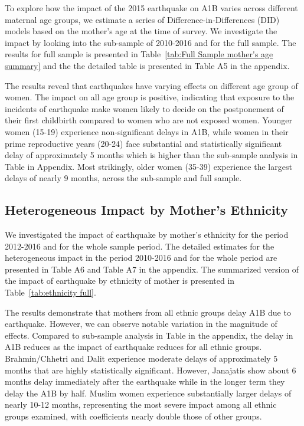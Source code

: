 \documentclass[11pt,a4paper]{article}
\begin{document}
To explore how the impact of the 2015 earthquake on A1B varies across different maternal age groups, we estimate a series of Difference-in-Differences (DID) models based on the mother's age at the time of survey. We investigate the impact by looking into the sub-sample of 2010-2016 and for the full sample. The results for full sample is presented in Table~\ref{tab:Full Sample mother's age summary} and the the detailed table is presented in Table A5 in the appendix.

\vspace{0.25cm}



The results reveal that earthquakes have varying effects on different age group of women. The impact on all age group is positive, indicating that exposure to the incidents of earthquake make women likely to decide on the postponement of their first childbirth compared to women who are not exposed women. Younger women (15-19) experience non-significant delays in A1B, while women in their prime reproductive years (20-24) face substantial and statistically significant delay of approximately 5 months which is higher than the sub-sample analysis in Table in Appendix. Most strikingly, older women (35-39) experience the largest delays of nearly 9 months, across the sub-sample and full sample.

\subsection{Heterogeneous Impact by Mother's Ethnicity}

We investigated the impact of earthquake by mother's ethnicity for the period 2012-2016 and for the whole sample period. The detailed estimates for the heterogeneous impact in the period 2010-2016 and for the whole period are presented in Table A6 and Table A7  in the appendix. The summarized version of the impact of earthquake by ethnicity of mother is presented in Table~\ref{tab:ethnicity full}.


The results demonstrate that mothers from all ethnic groups delay A1B due to earthquake. However, we can observe notable variation in the magnitude of effects. Compared to sub-sample analysis in Table in the appendix, the delay in A1B reduces as the impact of earthquake reduces for all ethnic groups. Brahmin/Chhetri and Dalit experience moderate delays of approximately 5 months that are highly statistically significant. However, Janajatis show about 6 months delay immediately after the earthquake while in the longer term they delay the A1B by half. Muslim women experience substantially larger delays of nearly 10-12 months, representing the most severe impact among all ethnic groups examined, with coefficients nearly double those of other groups.
\end{document}
